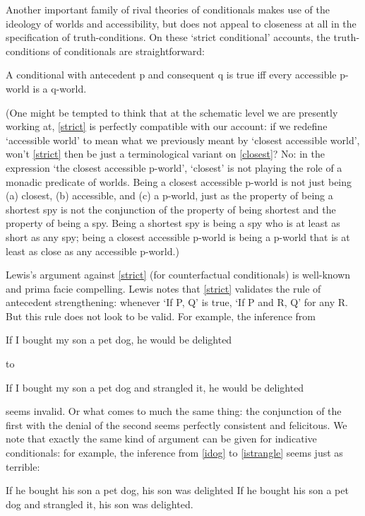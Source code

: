 \documentclass[If.tex]{subfiles}
\begin{document}
Another important family of rival theories of conditionals makes use of the ideology of worlds and accessibility, but does not appeal to closeness at all in the specification of truth-conditions. On these ‘strict conditional’ accounts, the truth-conditions of conditionals are straightforward:
\begin{prop}
\litem[STRICT] \label{strict}
	A conditional with antecedent p and consequent q is true iff every accessible p-world is a q-world.
\end{prop}
(One might be tempted to think that at the schematic level we are
presently working at, \ref{strict} is perfectly compatible with our account:
if we redefine ‘accessible world’ to mean what we previously meant by
‘closest accessible world’, won't \ref{strict} then be just a terminological
variant on \ref{closest}? No: in the expression ‘the closest accessible
p-world’, ‘closest’ is not playing the role of a monadic predicate of
worlds. Being a closest accessible p-world is not just being (a)
closest, (b) accessible, and (c) a p-world, just as the property of
being a shortest spy is not the conjunction of the property of being
shortest and the property of being a spy. Being a shortest spy is being
a spy who is at least as short as any spy; being a closest accessible
p-world is being a p-world that is at least as close as any accessible
p-world.)

Lewis's argument against \ref{strict} (for counterfactual conditionals) is
well-known and prima facie compelling. Lewis notes that \ref{strict} validates
the rule of antecedent strengthening: whenever ‘If P, Q’ is true, ‘If P
and R, Q’ for any R. But this rule does not look to be valid. For example, the inference
from
\begin{prop}
	\nitem \label{dog}
	If I bought my son a pet dog, he would be delighted
\end{prop}
to
\begin{prop}
	\nitem \label{strangle}
	If I bought my son a pet dog and strangled it, he would be delighted
\end{prop}
seems invalid. Or what comes to much the same thing: the conjunction of the first with the denial of the second seems perfectly consistent and felicitous. We note that exactly the same kind of argument can be given for indicative conditionals: for example, the inference from \ref{idog} to \ref{istrangle} seems just as terrible:
\begin{prop}
	\nitem \label{idog}
	If he bought his son a pet dog, his son was delighted
	\nitem \label{istrangle}
	If he bought his son a pet dog and strangled it, his son was delighted.
\end{prop}
\end{document}
